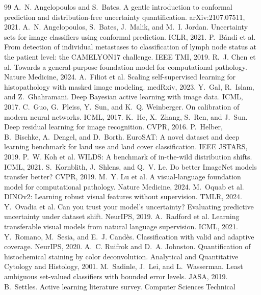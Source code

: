 \documentclass[10pt,twocolumn]{article}
\begin{document}
{\footnotesize
\begin{thebibliography}{99}\setlength{\itemsep}{0pt}
 A.~N. Angelopoulos and S.~Bates. A gentle introduction to conformal
prediction and distribution-free uncertainty quantification. arXiv:2107.07511, 2021.
 A.~N. Angelopoulos, S.~Bates, J.~Malik, and M.~I. Jordan.
Uncertainty sets for image classifiers using conformal prediction. ICLR, 2021.
 P.~B\'andi et al. From detection of individual metastases to classification
of lymph node status at the patient level: the CAMELYON17 challenge. IEEE TMI, 2019.
 R.~J. Chen et al. Towards a general-purpose foundation model for computational
pathology. Nature Medicine, 2024.
 A.~Filiot et al. Scaling self-supervised learning for histopathology with
masked image modeling. medRxiv, 2023.
 Y.~Gal, R.~Islam, and Z.~Ghahramani. Deep Bayesian active learning with image
data. ICML, 2017.
 C.~Guo, G.~Pleiss, Y.~Sun, and K.~Q. Weinberger. On calibration of modern
neural networks. ICML, 2017.
 K.~He, X.~Zhang, S.~Ren, and J.~Sun. Deep residual learning for image
recognition. CVPR, 2016.
 P.~Helber, B.~Bischke, A.~Dengel, and D.~Borth. EuroSAT: A novel dataset
and deep learning benchmark for land use and land cover classification. IEEE JSTARS, 2019.
 P.~W. Koh et al. WILDS: A benchmark of in-the-wild distribution shifts. ICML,
2021.
 S.~Kornblith, J.~Shlens, and Q.~V. Le. Do better ImageNet models transfer
better? CVPR, 2019.
 M.~Y. Lu et al. A visual-language foundation model for computational pathology.
Nature Medicine, 2024.
 M.~Oquab et al. DINOv2: Learning robust visual features without
supervision. TMLR, 2024.
 Y.~Ovadia et al. Can you trust your model's uncertainty? Evaluating
predictive uncertainty under dataset shift. NeurIPS, 2019.
 A.~Radford et al. Learning transferable visual models from natural
language supervision. ICML, 2021.
 Y.~Romano, M.~Sesia, and E.~J. Cand\`es. Classification with valid and
adaptive coverage. NeurIPS, 2020.
 A.~C. Ruifrok and D.~A. Johnston. Quantification of histochemical staining
by color deconvolution. Analytical and Quantitative Cytology and Histology, 2001.
 M.~Sadinle, J.~Lei, and L.~Wasserman. Least ambiguous set-valued
classifiers with bounded error levels. JASA, 2019.
 B.~Settles. Active learning literature survey. Computer Sciences Technical

\end{thebibliography}}
\end{document}
